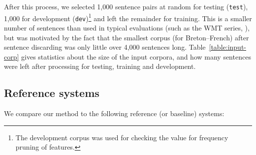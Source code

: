 \documentclass[11pt]{article}
\begin{document}
After this process, we selected 1,000 sentence pairs at random for
testing (\texttt{test}), 1,000 for development (\texttt{dev})\footnote{The development corpus  
  was used for checking the value for frequency pruning of features.} and 
left the remainder for training. This is a smaller
number of sentences than used in typical evaluations (such as the WMT
series, \cite{callisonburch2012}), but was motivated by the fact that
the smallest corpus (for Breton--French) after sentence discarding was
only little over 4,000 sentences long. Table~\ref{table:input-corp}
gives statistics about the size of the input corpora, and how many
sentences were left after processing for testing, training and
development. %

\subsection{Reference systems}

We compare our method to the following reference (or baseline) systems:
\end{document}

